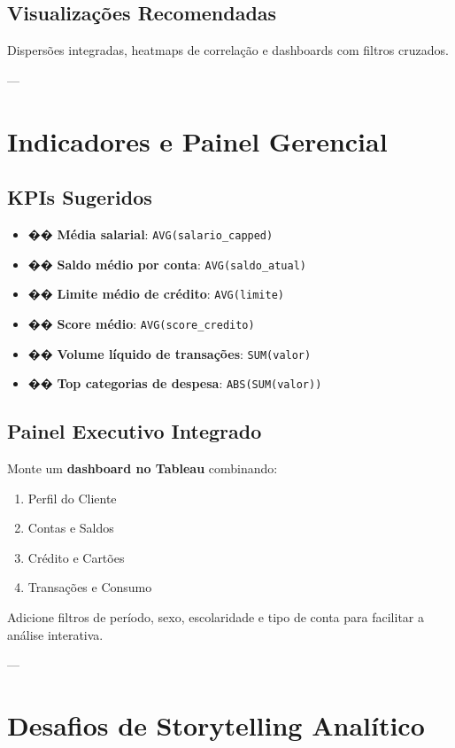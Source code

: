 \begin{appendices}
\subsection*{Visualizações Recomendadas}
Dispersões integradas, heatmaps de correlação e dashboards com filtros cruzados.

---

\section{Indicadores e Painel Gerencial}

\subsection*{KPIs Sugeridos}
\begin{itemize}
  \item �� \textbf{Média salarial}: \texttt{AVG(salario\_capped)}
  \item �� \textbf{Saldo médio por conta}: \texttt{AVG(saldo\_atual)}
  \item �� \textbf{Limite médio de crédito}: \texttt{AVG(limite)}
  \item �� \textbf{Score médio}: \texttt{AVG(score\_credito)}
  \item �� \textbf{Volume líquido de transações}: \texttt{SUM(valor)}
  \item �� \textbf{Top categorias de despesa}: \texttt{ABS(SUM(valor))}
\end{itemize}

\subsection*{Painel Executivo Integrado}
Monte um \textbf{dashboard no Tableau} combinando:
\begin{enumerate}
  \item Perfil do Cliente
  \item Contas e Saldos
  \item Crédito e Cartões
  \item Transações e Consumo
\end{enumerate}

Adicione filtros de período, sexo, escolaridade e tipo de conta para facilitar a análise interativa.

---

\section{Desafios de Storytelling Analítico}


\end{appendices}
